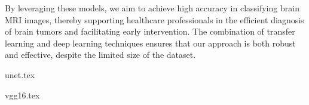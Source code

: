By leveraging these models, we aim to achieve high accuracy in classifying brain MRI images, thereby supporting healthcare professionals in the efficient diagnosis of brain tumors and facilitating early intervention. The combination of transfer learning and deep learning techniques ensures that our approach is both robust and effective, despite the limited size of the dataset.


{unet.tex}

{vgg16.tex}
